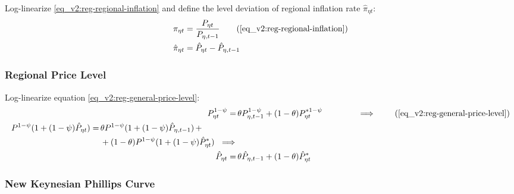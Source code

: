 \documentclass[../thesis.tex]{subfiles}
\begin{document}
Log-linearize \ref{eq_v2:reg-regional-inflation} and define the level deviation of regional inflation rate $\hat{\pi}_{\eta t}$:
\begin{align}
	\pi_{\eta t} &= \frac{P_{\eta t}}{P_{\eta, t-1}} \tag{\ref{eq_v2:reg-regional-inflation}} \\
	\hat{\pi}_{\eta t} &= \hat{P}_{\eta t} - \hat{P}_{\eta, t-1}
	\label{eq_v2:level-dev-regional-inflation}
\end{align}


\subsubsection*{Regional Price Level}

Log-linearize equation \ref{eq_v2:reg-general-price-level}:
\begin{align}
	P_{\eta t}^{1-\psi} =\, &\theta P_{\eta, t-1}^{1-\psi} + (1-\theta) P_{\eta t}^{\ast 1-\psi} \qquad \qquad \implies \tag{\ref{eq_v2:reg-general-price-level}} \\
	\begin{split} P^{1-\psi} (1 + (1-\psi)\hat{P}_{\eta t}) =\, &\theta P^{1-\psi} (1 + (1-\psi)\hat{P}_{\eta, t-1}) \, + \\ & + (1-\theta) P^{1-\psi} (1 + (1-\psi)\hat{P}_{\eta t}^{\ast}) \ \implies \nonumber \end{split} \\
	\hat{P}_{\eta t} =\, &\theta \hat{P}_{\eta, t-1} + (1-\theta) \hat{P}_{\eta t}^{\ast}
	\label{eq_v2:reg-ll-general-price-level}
\end{align}


\subsubsection*{New Keynesian Phillips Curve}
\end{document}
